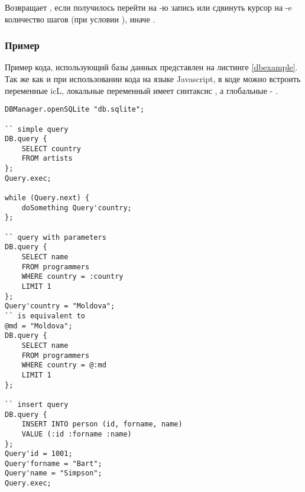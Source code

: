 Возвращает \true, если получилось перейти на -ю запись или сдвинуть курсор на -e количество шагов (при условии ), иначе \false.

\subsubsection{Пример}

Пример кода, использующий базы данных представлен на листинге \ref{dbexample}. Так же как и при использовании кода на языке Javascript, в коде можно встроить переменные icL, локальные переменный имеет синтаксис , а глобальные - .

\begin{lstlisting}[caption=Пример кода использующий базу данных, label=dbexample]
DBManager.openSQLite "db.sqlite";

`` simple query
DB.query {
	SELECT country
	FROM artists
};
Query.exec;

while (Query.next) {
    doSomething Query'country;
};

`` query with parameters
DB.query {
	SELECT name
	FROM programmers
	WHERE country = :country
	LIMIT 1
};
Query'country = "Moldova";
`` is equivalent to
@md = "Moldova";
DB.query {
	SELECT name
	FROM programmers
	WHERE country = @:md
	LIMIT 1
};

`` insert query
DB.query {
	INSERT INTO person (id, forname, name)
	VALUE (:id :forname :name)
};
Query'id = 1001;
Query'forname = "Bart";
Query'name = "Simpson";
Query.exec;
\end{lstlisting}

